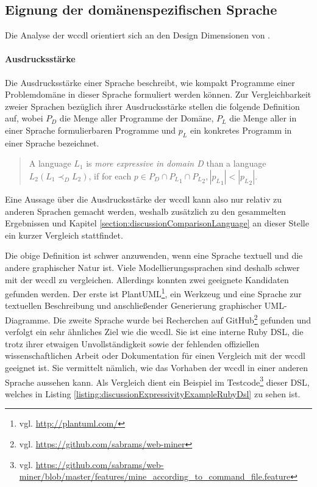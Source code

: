 \subsection{Eignung der domänenspezifischen Sprache}
    \label{section:discussionInterpretationLanguage}
    Die Analyse der \gls{wccdl} orientiert sich
    an den Design Dimensionen von \cite{voelter:DslEngineering}.

    \paragraph{Ausdrucksstärke}
    Die Ausdrucksstärke einer Sprache beschreibt,
    wie kompakt Programme einer Problemdomäne in dieser Sprache
    formuliert werden können.
    Zur Vergleichbarkeit zweier Sprachen bezüglich ihrer Ausdrucksstärke
    stellen \citet[Kapitel 4.1]{voelter:DslEngineering} die folgende
    Definition auf, wobei
    $P_D$ die Menge aller Programme der Domäne,
    $P_L$ die Menge aller in einer Sprache formulierbaren Programme und
    $p_L$ ein konkretes Programm in einer Sprache bezeichnet.

    \begin{quote}
        A language $L_1$ is \textit{more expressive in domain D}
        than a language $L_2 (L_1 {\prec}_D L_2)$,
        if for each $p \in P_D \cap {P_L}_1 \cap {P_L}_2, |{p_L}_1| < |{p_L}_2|$.
    \end{quote}

    Eine Aussage über die Ausdrucksstärke der \gls{wccdl} kann also
    nur relativ zu anderen Sprachen gemacht werden,
    weshalb zusätzlich zu den gesammelten Ergebnissen und
    Kapitel \ref{section:discussionComparisonLanguage}
    an dieser Stelle ein kurzer Vergleich stattfindet.

    Die obige Definition ist schwer anzuwenden,
    wenn eine Sprache textuell und die andere graphischer Natur ist.
    Viele Modellierungssprachen sind deshalb schwer mit der \gls{wccdl} zu vergleichen.
    Allerdings konnten zwei geeignete Kandidaten gefunden werden.
    Der erste ist PlantUML\footnote{vgl. \url{http://plantuml.com/}},
    ein Werkzeug und eine Sprache zur textuellen Beschreibung und anschließender
    Generierung graphischer UML-Diagramme.
    Die zweite Sprache wurde bei Recherchen auf
    GitHub\footnote{vgl. \url{https://github.com/sabrams/web-miner}} gefunden
    und verfolgt ein sehr ähnliches Ziel wie die \gls{wccdl}.
    Sie ist eine interne Ruby DSL, die trotz ihrer etwaigen Unvollständigkeit sowie der fehlenden
    offiziellen wissenschaftlichen Arbeit oder Dokumentation
    für einen Vergleich mit der \gls{wccdl} geeignet ist.
    Sie vermittelt nämlich, wie das Vorhaben der \gls{wccdl}
    in einer anderen Sprache aussehen kann.
    Als Vergleich dient ein Beispiel im
    Testcode\footnote{vgl. \url{https://github.com/sabrams/web-miner/blob/master/features/mine_according_to_command_file.feature}}
    dieser DSL, welches in Listing \ref{listing:discussionExpressivityExampleRubyDsl}
    zu sehen ist.

